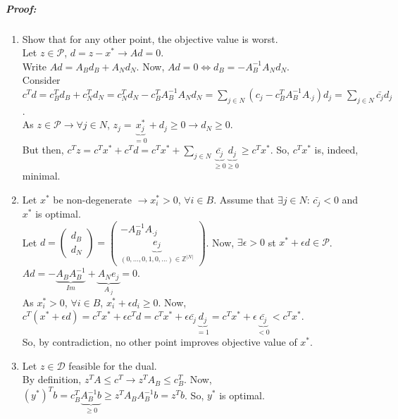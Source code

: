 \documentclass[main]{subfiles}
\begin{document}
\subparagraph{Proof:}
\begin{enumerate}
\item Show that for any other point, the objective value is worst.\\
Let $z \in \mathcal{P}$, $d = z -x^* \rightarrow Ad = 0$.\\
Write $Ad = A_B d_B + A_N d_N$. Now, $Ad = 0 \iff d_B = -A^{-1}_B A_N d_N$.\\
Consider $c^T d = c^T_B d_B + c^T_N d_N = c^T_N d_N - c^T_B A^{-1}_B A_N d_N =
\sum_{j \in N} (c_j - c^T_B A^{-1}_B A_{\cdot j})d_j = \sum_{j \in N}
\bar{c_j}d_j$.\\
As $z \in \mathcal{P} \rightarrow \forall j \in N$, $z_j =
\underbrace{x^*_j}_{=0} + d_j \geq 0 \rightarrow d_N \geq 0$.\\
But then, $c^T z = c^T x^* + c^T d = c^T x^* +
\sum_{j \in N} \underbrace{\bar{c_j}}_{\geq 0} \underbrace{d_j}_{\geq 0}
\geq c^T x^*$. So, $c^T x^*$ is, indeed, minimal.

\item Let $x^*$ be non-degenerate $\rightarrow x^*_i > 0$, $\forall i \in B$.
Assume that $\exists j \in N$: $\bar{c_j} < 0$ and $x^*$ is optimal.\\
Let $d =
\begin{pmatrix}
d_B\\
d_N
\end{pmatrix}
=
\begin{pmatrix}
-A^{-1}_B A_{\cdot j}\\
\underbrace{e_j}_{(0,\dots, 0, 1, 0, \dots) \in \mathbb{Z}^{|N|}}
\end{pmatrix}$.
Now, $\exists \epsilon > 0$ st $x^* + \epsilon d \in \mathcal{P}$.\\
$Ad = -\underbrace{A_B A^{-1}_B}_{Im} + \underbrace{A_N e_j}_{A_{\cdot j}} =
0$.\\
As $x^*_i > 0$, $\forall i \in B$, $x^*_i + \epsilon d_i \geq 0$.
Now, $c^T(x^* + \epsilon d) = c^T x^* + \epsilon c^T d = c^T x^* + \epsilon
\bar{c_j} \underbrace{d_j}_{=1} = c^T x^* + \epsilon
\underbrace{\bar{c_j}}_{< 0} < c^T x^*$.\\
So, by contradiction, no other point improves objective value of $x^*$.

\item Let $z \in \mathcal{D}$ feasible for the dual. \\
By definition, $z^T A \leq c^T \rightarrow z^T A_B \leq c^T_B$.
Now, $(y^*)^T b = c^T_B \underbrace{A^{-1}_B b}_{\geq 0}
\geq z^T A_B A^{-1}_B b = z^T b$. So, $y^*$ is optimal.

\end{enumerate}
\end{document}
